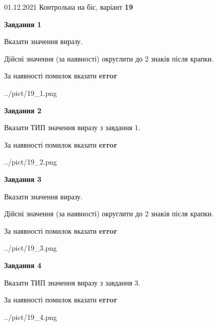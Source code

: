 \documentclass[11pt, ukrainian]{article}
\begin{document}
{01.12.2021 Контрольна на біс, варіант  \No \textbf { 19 }\par}
{
\begin {large}
{\begin {center}\textbf{Завдання 1}\end {center}}\par
Вказати значення виразу. \par
Дійсні значення (за наявності) округлити до 2 знаків після крапки. \par
За наявності помилок вказати \textbf{error}

\begin{center}
	{../pict/19_1.png}
\end{center}
\newpage

{\begin {center}\textbf{Завдання 2}\end {center}}\par
Вказати ТИП значення виразу з завдання 1. \par
За наявності помилок вказати \textbf{error}

\begin{center}
	{../pict/19_2.png}
\end{center}
\newpage

{\begin {center}\textbf{Завдання 3}\end {center}}\par
Вказати значення виразу. \par
Дійсні значення (за наявності) округлити до 2 знаків після крапки. \par
За наявності помилок вказати \textbf{error}

\begin{center}
	{../pict/19_3.png}
\end{center}
\newpage

{\begin {center}\textbf{Завдання 4}\end {center}}\par
Вказати ТИП значення виразу з завдання 3. \par
За наявності помилок вказати \textbf{error}

\begin{center}
	{../pict/19_4.png}
\end{center}
\newpage


\end{large}}
\end{document}
